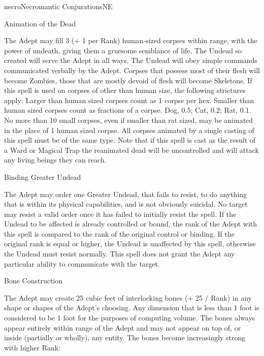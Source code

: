 \begin{college}[1.1]{necro}{Necromantic Conjurations}{NE}
\begin{spell}[S-2]{Animation of the Dead}
\begin{effects}
The Adept may fill 3 (+ 1 per Rank) human-sized corpses within range,
with the power of undeath, giving them a gruesome semblance of life.
The Undead so created will serve the Adept in all ways.  The Undead
will obey simple commands communicated verbally by the Adept.  Corpses
that possess most of their flesh will become Zombies, those that are
mostly devoid of flesh will become Skeletons.  If this spell is used
on corpses of other than human size, the following strictures apply:
Larger than human sized corpses count as 1 corpse per hex.  Smaller
than human sized corpses count as fractions of a corpse.  Dog, 0.5;
Cat, 0.2; Rat, 0.1.  No more than 10 small corpses, even if smaller
than rat sized, may be animated in the place of 1 human sized corpse.
All corpses animated by a single casting of this spell must be of
the same type.  Note that if this spell is cast as the result of a
Ward or Magical Trap the reanimated dead will be uncontrolled and will
attack any living beings they can reach.
\end{effects}
\end{spell}

\begin{spell}[S-3]{Binding Greater Undead}

\begin{effects}
The Adept may order one Greater Undead, that fails to resist, to do
anything that is within its physical capabilities, and is not
obviously suicidal.  No target may resist a valid order once it has
failed to initially resist the spell.  If the Undead to be affected is
already controlled or bound, the rank of the Adept with this spell is
compared to the rank of the original control or binding.  If the
original rank is equal or higher, the Undead is unaffected by this
spell, otherwise the Undead must resist normally.  This spell does not
grant the Adept any particular ability to communicate with the target.
\end{effects}
\end{spell}

\begin{spell}[S-4]{Bone Construction}

\begin{effects}
The Adept may create 25 cubic feet of interlocking bones (+ 25 / Rank)
in any shape or shapes of the Adept's choosing.  Any dimension that is
less than 1 foot is considered to be 1 foot for the purposes of
computing volume.  The bones always appear entirely within range of
the Adept and may not appear on top of, or inside (partially or
wholly), any entity.  The bones become increasingly strong with higher
Rank:


\end{effects}
\end{spell}
\end{college}
